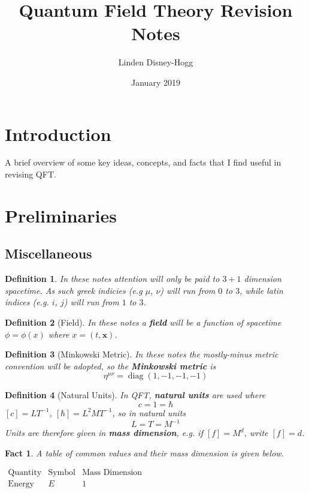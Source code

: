\documentclass{article}
\title{Quantum Field Theory Revision Notes}
\author{Linden Disney-Hogg}
\date{January 2019}
\newtheorem{definition}{Definition}[subsection]
\newtheorem{fact}{Fact}[subsection]
\DeclareMathOperator{\diag}{diag}
\newcommand{\bam}[1]{\textbf{#1}}
\begin{document}
\maketitle
\tableofcontents

\section{Introduction}
A brief overview of some key ideas, concepts, and facts that I find useful in revising QFT. 

\section{Preliminaries}

\subsection{Miscellaneous}

\begin{definition}
In these notes attention will only be paid to $3+1$ dimension spacetime. As such greek indicies (e.g $\mu$, $\nu$) will run from $0$ to $3$, while latin indices (e.g. $i$, $j$) will run from $1$ to $3$. 
\end{definition}

\begin{definition}[Field]
In these notes a \bam{field} will be a function of spacetime $\phi=\phi(x)$ where $x=(t,\bm{x})$. 
\end{definition}

\begin{definition}[Minkowski Metric]
In these notes the mostly-minus metric convention will be adopted, so the \bam{Minkowski metric} is 
\[
\eta^{\mu\nu}=\diag(1, -1, -1, -1)
\]
\end{definition}

\begin{definition}[Natural Units]
In QFT, \bam{natural units} are used where
\[
c=1=\hbar
\]
$[c]=LT^{-1}$, $[\hbar]=L^2 M T^{-1}$, so in natural units
\[
L=T=M^{-1}
\]
Units are therefore given in \bam{mass dimension}, e.g. if $[f]=M^d$, write $[f]=d$.
\end{definition}

\begin{fact}
A table of common values and their mass dimension is given below. 
\begin{center}$
\begin{array}{ccc}
    \text{Quantity} & \text{Symbol} & \text{Mass Dimension} \\
    \hline
    \hline
    \text{Energy} & E & 1 \\
     
\end{array}
$\end{center}
\end{fact}
\end{document}
